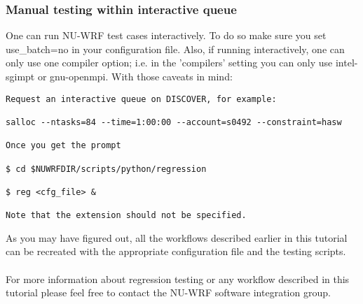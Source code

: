 \begin{frame}[fragile]\frametitle{Manual testing within interactive queue}

One can run NU-WRF test cases interactively. To do so make sure you set use\_batch=no in 
your configuration file. Also, if running interactively, one can only use one compiler option; i.e.
in the 'compilers' setting you can only use intel-sgimpt or gnu-openmpi. With those caveats in mind:

\footnotesize{
\begin{verbatim}
Request an interactive queue on DISCOVER, for example:

salloc --ntasks=84 --time=1:00:00 --account=s0492 --constraint=hasw

Once you get the prompt

$ cd $NUWRFDIR/scripts/python/regression 

$ reg <cfg_file> &

Note that the extension should not be specified.
\end{verbatim}
}

\end{frame}

\begin{frame}

As you may have figured out, all the workflows described 
earlier in this tutorial can be recreated with the appropriate
configuration file and the testing scripts.\\
\mbox{}\\
For more information about regression testing or any workflow described in this
tutorial please feel free to contact the NU-WRF software integration group.


\end{frame}



